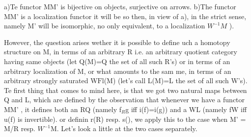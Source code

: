 a)\quad Te functor M\hand{$\to$}M' is bijective on objects,  surjective on arrows.
b)\quad The functor M\hand{$\to$}M' is a localization functor \hand{(}it will be so then,  in
view of a),  in the strict sense,  namely M' will be isomorphic,  no
only equivalent, to a localization $W^{-1}M$ ).

However,  the question arises wether it is possible to define uch
a homotopy structure on M,  in terms of an arbitrary R i.e. an arbitrary
quotient category having same objects  (let Q(M)=Q the set of all such R's)\hand{,}
or in terms of an arbitrary localization of M,  or what amounts to the sam
me,  in terms of an arbitrary strongly saturated W\hand{$\subset$}$\mathrm{Fl}$(M)  (let's call
L(M)=L  the set of all such W's).  Te first thing that comes to mind
here,  is that we got two natural maps
 
between Q and L,  which are defined by the observation that whenever we
have a functor  M\hand{$\to$}M' , \hand{,} it defines both an R\hand{$\in$}Q  (namely f\hand{$\sim$}$_{R}$g  iff
i(f)=i(g))  and a W\hand{$\in$}L (namely f\hand{$\in$}W  iff u(f) is invertible).  or definin
r(R)  resp. s(),  we apply this to the case when M' = M/R  resp. $W^{-1}$M.
Let's look a little at the two cases separately.

